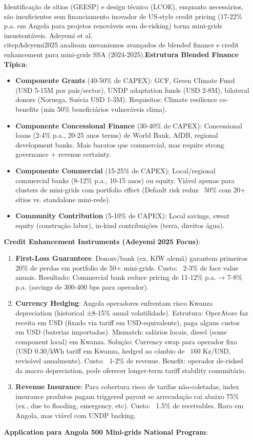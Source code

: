 \documentclass[12pt, a4paper]{article}
\begin{document}
Identificação de sítios (GEESP) e design técnico (LCOE), enquanto necessários, são insuficientes sem financiamento inovador de US-style credit pricing (17-22\% p.a. em Angola para projetos renováveis sem de-risking) torna mini-grids insustentáveis. Adeyemi et al.~\\citep{Adeyemi2025} analisam mecanismos avançados de blended finance e credit enhancement para mini-grids SSA (2024-2025).\textbf{Estrutura Blended Finance Típica}:
\begin{itemize}
\item\textbf{Componente Grants} (40-50\% de CAPEX): GCF, Green Climate Fund (USD 5-15M por país/sector), UNDP adaptation funds (USD 2-8M), bilateral donors (Noruega, Suécia USD 1-3M). Requisitos: Climate resilience co-benefits (min 50\% beneficiários vulneráveis clima).
\item\textbf{Componente Concessional Finance} (30-40\% de CAPEX): Concessional loans (2-4\% p.a., 20-25 anos terms) de World Bank, AfDB, regional development banks. Mais baratos que commercial, mas require strong governance + revenue certainty.
\item\textbf{Componente Commercial} (15-25\% de CAPEX): Local/regional commercial banks (8-12\% p.a., 10-15 anos) ou equity. Viável apenas para clusters de mini-grids com portfolio effect (Default risk reduz ~50\% com 20+ sítios vs. standalone mini-rede).
\item\textbf{Community Contribution} (5-10\% de CAPEX): Local savings, sweat equity (construção labor), in-kind contribuições (terra, direitos água).
\end{itemize}\textbf{Credit Enhancement Instruments (Adeyemi 2025 Focus)}:
\begin{enumerate}
\item\textbf{First-Loss Guarantees}: Donors/bank (ex. KfW alemã) garantem primeiros 20\% de perdas em portfolio de 50+ mini-grids. Custo: ~2-3\% de face value anuais. Resultado: Commercial bank reduce pricing de 11-12\% p.a. → 7-8\% p.a. (savings de 300-400 bps para operador).
\item\textbf{Currency Hedging}: Angola operadores enfrentam risco Kwanza depreciation (historical ±8-15\% anual volatilidade). Estrutura: OperAtore faz receita em USD (fixado via tariff em USD-equivalente), paga alguns custos em USD (baterias importadas). Mismatch: salários locais, diesel (some component local) em Kwanza. Solução: Currency swap para operador fixo (USD 0.30/kWh tariff em Kwanza, hedged ao câmbio de ~160 Kz/USD, revisável anualmente). Custo: ~1-2\% de revenue. Benefit: operador de-risked da macro depreciation, pode oferecer longer-term tariff stability comunitário.
\item\textbf{Revenue Insurance}: Para cobertura risco de tarifas não-coletadas, index insurance produtos pagam triggered payout se arrecadação cai abaixo 75\% (ex., due to flooding, emergency, etc). Custo: ~1.5\% de receivables. Raro em Angola, mas viável com UNDP backing.
\end{enumerate}\textbf{Application para Angola 500 Mini-grids National Program}:
\end{document}
